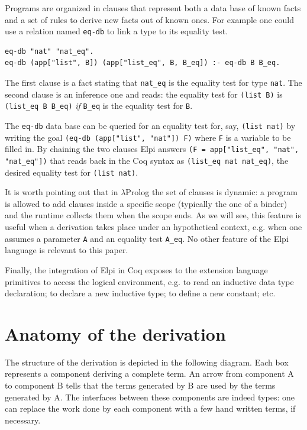 \documentclass[a4paper,UKenglish,cleveref, autoref]{lipics-v2019}
\begin{document}
Programs are
organized in clauses that represent both a data base of known facts
and a set of rules to derive new facts out of known ones.
For example one could use a relation named \lstinline+eq-db+
to link a type to its equality test.

\begin{lstlisting}
eq-db "nat" "nat_eq".
eq-db (app["list", B]) (app["list_eq", B, B_eq]) :- eq-db B B_eq.
\end{lstlisting}

The first clause is a fact stating that
\lstinline+nat_eq+ is the equality test for type
\lstinline+nat+.
The second clause is an inference one and reads: the equality test
for \lstinline+(list B)+ is \lstinline+(list_eq B B_eq)+ \emph{if}
\lstinline+B_eq+ is the equality test for \lstinline+B+.

The \lstinline+eq-db+ data base can be queried for
an equality test for, say, \lstinline+(list nat)+ by writing
the goal \lstinline+(eq-db (app["list", "nat"]) F)+
where \lstinline+F+ is a variable to be filled in.
By chaining the two clauses Elpi answers
\lstinline+(F = app["list_eq", "nat", "nat_eq"])+
that reads back in the Coq syntax as
\lstinline+(list_eq nat nat_eq)+, the desired
equality test for \lstinline+(list nat)+.

It is worth pointing out that in $\lambda$Prolog the set of clauses
is dynamic: a program is allowed to add clauses inside
a specific scope (typically the one of a binder) and the runtime
collects them when the scope ends. As we will see, this feature
is useful when a derivation takes place under an hypothetical
context, e.g. when one assumes a parameter \lstinline+A+ and
an equality test \lstinline+A_eq+.
No other feature of the Elpi language is relevant to this paper.

Finally, the integration of Elpi in Coq exposes to the extension
language primitives to access the logical environment, e.g.
to read an inductive data type declaration; to declare a
new inductive type; to define a new constant; etc.

\section{Anatomy of the derivation} %
\label{sec:code}

The structure of the derivation is depicted in the following diagram.
Each box represents a component deriving a complete term.
An arrow from component A to component B tells that the terms
generated by B are used by the terms generated by A. The interfaces
between these components are indeed types: one can replace the work
done by each component with a few hand written terms, if necessary.
\end{document}
